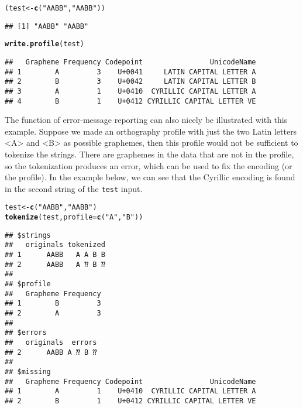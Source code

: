 \documentclass[output=inprep,
		biblatex
		]{LSP/langsci}\usepackage[]{graphicx}\usepackage[]{color}
\makeatletter
\newcommand{\hlstr}[1]{\textcolor[rgb]{0.192,0.494,0.8}{#1}}%
\newcommand{\hlstd}[1]{\textcolor[rgb]{0.345,0.345,0.345}{#1}}%
\newcommand{\hlkwb}[1]{\textcolor[rgb]{0.69,0.353,0.396}{#1}}%
\newcommand{\hlkwc}[1]{\textcolor[rgb]{0.333,0.667,0.333}{#1}}%
\newcommand{\hlkwd}[1]{\textcolor[rgb]{0.737,0.353,0.396}{\textbf{#1}}}%
\newenvironment{kframe}{%
 \def\at@end@of@kframe{}%
 \ifinner\ifhmode%
  \def\at@end@of@kframe{\end{minipage}}%
  \begin{minipage}{\columnwidth}%
 \fi\fi%
 \def\FrameCommand##1{\hskip\@totalleftmargin \hskip-\fboxsep
 \colorbox{shadecolor}{##1}\hskip-\fboxsep
     \hskip-\linewidth \hskip-\@totalleftmargin \hskip\columnwidth}%
 \MakeFramed {\advance\hsize-\width
   \@totalleftmargin\z@ \linewidth\hsize
   \@setminipage}}%
 {\par\unskip\endMakeFramed%
 \at@end@of@kframe}
\newenvironment{knitrout}{}{} %
\makeatother
\begin{document}
\begin{knitrout}\footnotesize
{}\color{fgcolor}\begin{kframe}
\begin{alltt}
\hlstd{(test} \hlkwb{<-} \hlkwd{c}\hlstd{(}\hlstr{"AABB"}\hlstd{,} \hlstr{"AАBВ"}\hlstd{))}
\end{alltt}
\begin{verbatim}
## [1] "AABB" "AАBВ"
\end{verbatim}
\begin{alltt}
\hlkwd{write.profile}\hlstd{(test)}
\end{alltt}
\begin{verbatim}
##   Grapheme Frequency Codepoint                UnicodeName
## 1        A         3    U+0041     LATIN CAPITAL LETTER A
## 2        B         3    U+0042     LATIN CAPITAL LETTER B
## 3        А         1    U+0410  CYRILLIC CAPITAL LETTER A
## 4        В         1    U+0412 CYRILLIC CAPITAL LETTER VE
\end{verbatim}
\end{kframe}
\end{knitrout}

The function of error-message reporting can also nicely be illustrated
with this example. Suppose we made an orthography profile with just the two
Latin letters <A> and <B> as possible graphemes, then this profile would not be
sufficient to tokenize the strings. There are graphemes in the data that are not
in the profile, so the tokenization produces an error, which can be used to fix
the encoding (or the profile). In the example below, we can see that the
Cyrillic encoding is found in the second string of the \texttt{test} input.

\begin{knitrout}\footnotesize
{}\color{fgcolor}\begin{kframe}
\begin{alltt}
\hlstd{test} \hlkwb{<-} \hlkwd{c}\hlstd{(}\hlstr{"AABB"}\hlstd{,} \hlstr{"AАBВ"}\hlstd{)}
\hlkwd{tokenize}\hlstd{(test,} \hlkwc{profile} \hlstd{=} \hlkwd{c}\hlstd{(}\hlstr{"A"}\hlstd{,} \hlstr{"B"}\hlstd{))}
\end{alltt}


{\ttfamily\noindent{}}\begin{verbatim}
## $strings
##   originals tokenized
## 1      AABB   A A B B
## 2      AАBВ   A ⁇ B ⁇
## 
## $profile
##   Grapheme Frequency
## 1        B         3
## 2        A         3
## 
## $errors
##   originals  errors
## 2      AАBВ A ⁇ B ⁇
## 
## $missing
##   Grapheme Frequency Codepoint                UnicodeName
## 1        А         1    U+0410  CYRILLIC CAPITAL LETTER A
## 2        В         1    U+0412 CYRILLIC CAPITAL LETTER VE
\end{verbatim}
\end{kframe}
\end{knitrout}
\end{document}
